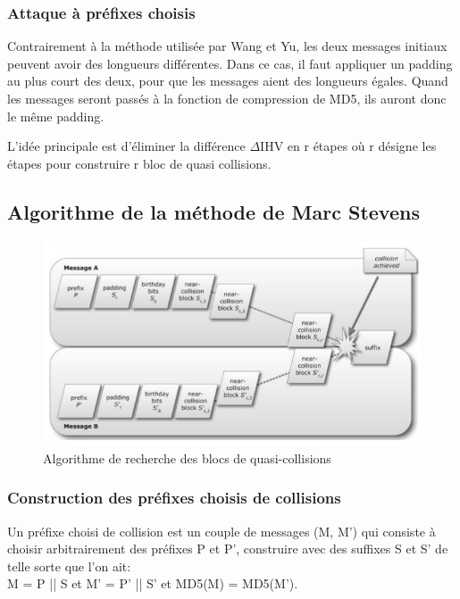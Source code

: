 \subsubsection{Attaque à préfixes choisis}
Contrairement à la méthode utilisée par Wang et Yu, les deux messages initiaux peuvent avoir des longueurs différentes. Dans ce cas, il faut appliquer un padding au plus court des deux, pour que les messages aient des longueurs égales. Quand les messages seront passés à la fonction de compression de MD5, ils auront donc le même padding.

L'idée principale est d'éliminer la différence $\Delta$IHV en r étapes où r désigne les étapes pour construire r bloc de quasi collisions.

\subsection{Algorithme de la méthode de Marc Stevens}
\begin{figure}[h!]
  \includegraphics[scale=.61]{./images/col.png}
  \caption{Algorithme de recherche des blocs de quasi-collisions}
\end{figure}


\subsubsection{Construction des préfixes choisis de collisions}
Un préfixe choisi de collision est un couple de messages (M, M') qui consiste à choisir arbitrairement des préfixes P et P', construire avec des suffixes S et S' de telle sorte que l'on ait:\\
M = P || S et M' = P' || S' et MD5(M) = MD5(M').\\


